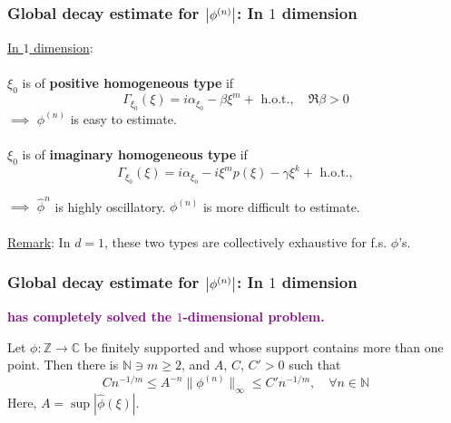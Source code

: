 \documentclass{beamer}
\theoremstyle{definition}
\begin{document}
\begin{frame}
\frametitle{Global decay estimate for $\abs{\phi^{(n)}}$: In $1$ dimension}

\underline{In $1$ dimension}:\\
$\,$\\

$\xi_0$ is of \textbf{positive homogeneous type} if
\begin{equation*}
\Gamma_{\xi_0}(\xi) = i\alpha_{\xi_0} - \beta \xi^m + \text{ h.o.t.}, \quad \Re{\beta} >0
\end{equation*}
$\implies$ $\phi^{(n)}$ is easy to estimate.\\
$\,$\\

$\xi_0$ is of \textbf{imaginary homogeneous type} if
\begin{equation*}
\Gamma_{\xi_0}(\xi) = i\alpha_{\xi_0} - i\xi^mp(\xi) - \gamma \xi^k   + \text{ h.o.t.},  
\end{equation*}

$\implies$ $\widehat{\phi}^n$ is highly oscillatory. $\phi^{(n)}$ is more difficult to estimate.\\
$\,$\\
\underline{Remark}: In $d=1$, these two types are collectively exhaustive for f.s. $\phi$'s.
\end{frame}




\begin{frame}
\frametitle{Global decay estimate for $\abs{\phi^{(n)}}$: In $1$ dimension}




\begin{center}
	\textbf{\textcolor{purple}{\cite{randles_convolution_2015} has completely solved the $1$-dimensional problem. }  }
\end{center}


\begin{theorem}
	Let $\phi : \mathbb{Z} \to \mathbb{C}$ be finitely supported and whose support contains more than one point. Then there is $\mathbb{N} \ni m \geq 2$, and $A$, $C$, $C' > 0$ such that 
	\begin{equation*}
	Cn^{-1/m} \leq A^{-n}\| \phi^{(n)} \|_\infty \leq C' n^{-1/m}, \quad \forall n\in \mathbb{N}
	\end{equation*}
	Here, $A=\sup|\widehat{\phi}(\xi)|$.
\end{theorem}


\end{frame}
\end{document}
